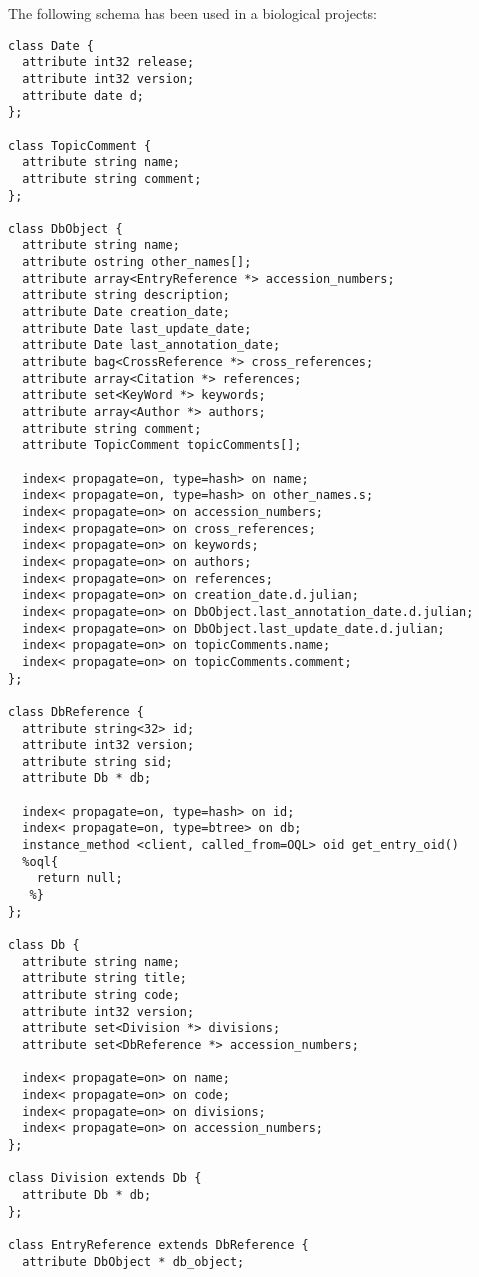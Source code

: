 \newpage
{}
The following schema has been used in a biological projects:
\verbsize
\begin{verbatim}
class Date {
  attribute int32 release;
  attribute int32 version;
  attribute date d;
};

class TopicComment {
  attribute string name;
  attribute string comment;
};

class DbObject {
  attribute string name;
  attribute ostring other_names[]; 
  attribute array<EntryReference *> accession_numbers;
  attribute string description;
  attribute Date creation_date;
  attribute Date last_update_date;
  attribute Date last_annotation_date;
  attribute bag<CrossReference *> cross_references;
  attribute array<Citation *> references;
  attribute set<KeyWord *> keywords;
  attribute array<Author *> authors;
  attribute string comment;
  attribute TopicComment topicComments[];

  index< propagate=on, type=hash> on name;
  index< propagate=on, type=hash> on other_names.s; 
  index< propagate=on> on accession_numbers;
  index< propagate=on> on cross_references;
  index< propagate=on> on keywords;
  index< propagate=on> on authors;
  index< propagate=on> on references;
  index< propagate=on> on creation_date.d.julian;
  index< propagate=on> on DbObject.last_annotation_date.d.julian;
  index< propagate=on> on DbObject.last_update_date.d.julian;
  index< propagate=on> on topicComments.name;
  index< propagate=on> on topicComments.comment;
};

class DbReference {
  attribute string<32> id;
  attribute int32 version;
  attribute string sid;
  attribute Db * db;

  index< propagate=on, type=hash> on id;
  index< propagate=on, type=btree> on db;
  instance_method <client, called_from=OQL> oid get_entry_oid()
    return null;
};

class Db {
  attribute string name;
  attribute string title;
  attribute string code;
  attribute int32 version;
  attribute set<Division *> divisions;
  attribute set<DbReference *> accession_numbers;

  index< propagate=on> on name;
  index< propagate=on> on code;
  index< propagate=on> on divisions;
  index< propagate=on> on accession_numbers;
};

class Division extends Db {
  attribute Db * db;
};

class EntryReference extends DbReference {
  attribute DbObject * db_object;


\end{verbatim}
